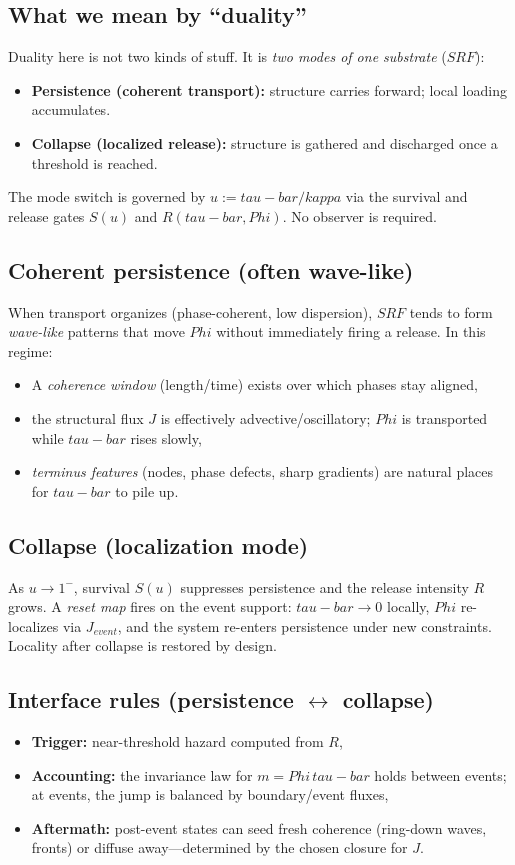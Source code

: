\documentclass[12pt]{article}
\newcommand{\FoldDensity}{\Phi}
\newcommand{\FoldTime}{\bar{\tau}}
\newcommand{\Threshold}{\kappa}
\newcommand{\Survival}{S}
\newcommand{\Release}{R}
\newcommand{\SRF}{\mathcal{F}_{\mathrm{SR}}}
\def\FoldDensity{Phi}%
\def\FoldTime{tau-bar}%
\def\Threshold{kappa}%
\def\SRF{SRF}%
\def\Survival{S}%
\def\Release{R}%
\def\bar#1{#1}%
\def\mathcal#1{#1}%
\def\mathrm#1{#1}%
\begin{document}
\subsection{What we mean by ``duality''}
Duality here is not two kinds of stuff. It is \emph{two modes of one substrate} ($\SRF$):
\begin{itemize}
  \item \textbf{Persistence (coherent transport):} structure carries forward; local loading accumulates.
  \item \textbf{Collapse (localized release):} structure is gathered and discharged once a threshold is reached.
\end{itemize}
The mode switch is governed by $u := \FoldTime/\Threshold$ via the survival and release gates $\Survival(u)$ and $\Release(\FoldTime,\FoldDensity)$. No observer is required.

\subsection{Coherent persistence (often wave-like)}
When transport organizes (phase-coherent, low dispersion), $\SRF$ tends to form \emph{wave-like} patterns that move $\FoldDensity$ without immediately firing a release. In this regime:
\begin{itemize}
  \item A \emph{coherence window} (length/time) exists over which phases stay aligned,
  \item the structural flux $J$ is effectively advective/oscillatory; $\FoldDensity$ is transported while $\FoldTime$ rises slowly,
  \item \emph{terminus features} (nodes, phase defects, sharp gradients) are natural places for $\FoldTime$ to pile up.
\end{itemize}

\subsection{Collapse (localization mode)}
As $u\to 1^{-}$, survival $\Survival(u)$ suppresses persistence and the release intensity $\Release$ grows.
A \emph{reset map} fires on the event support: $\FoldTime \to 0$ locally, $\FoldDensity$ re-localizes via $J_{\mathrm{event}}$, and the system re-enters persistence under new constraints.
Locality after collapse is restored by design.

\subsection{Interface rules (persistence $\leftrightarrow$ collapse)}
\begin{itemize}
  \item \textbf{Trigger:} near-threshold hazard computed from $\Release$,
  \item \textbf{Accounting:} the invariance law for $m=\FoldDensity\,\FoldTime$ holds between events; at events, the jump is balanced by boundary/event fluxes,
  \item \textbf{Aftermath:} post-event states can seed fresh coherence (ring-down waves, fronts) or diffuse away—determined by the chosen closure for $J$.
\end{itemize}
\end{document}
